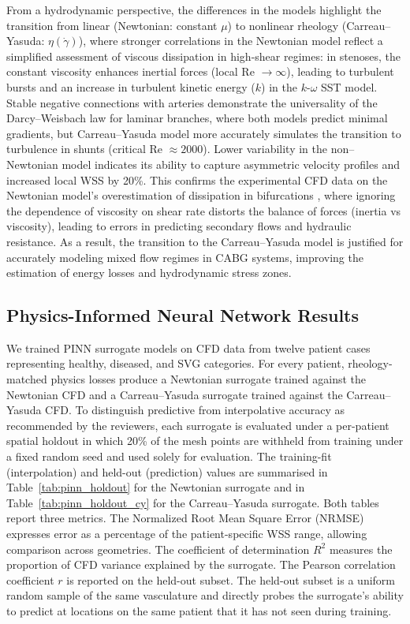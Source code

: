 ﻿\documentclass[12pt,a4paper]{article}
\newcommand{\added}[2][]{\begingroup\color{red}#2\endgroup}
\newcommand{\addp}[1]{\added{#1}}
\theoremstyle{definition}
\numberwithin{equation}{section}
\begin{document}
From a hydrodynamic perspective, the differences in the models highlight the transition from linear (Newtonian: constant $\mu$) to nonlinear rheology (Carreau--Yasuda: $\eta(\dot{\gamma})$), where stronger correlations in the Newtonian model reflect a simplified assessment of viscous dissipation in high-shear regimes: in stenoses, the constant viscosity enhances inertial forces (local Re $\rightarrow \infty$), leading to turbulent bursts and an increase in turbulent kinetic energy ($k$) in the $k$-$\omega$ SST model. Stable negative connections with arteries demonstrate the universality of the Darcy--Weisbach law for laminar branches, where both models predict minimal gradients, but Carreau--Yasuda model more accurately simulates the transition to turbulence in shunts (critical Re $\approx 2000$). Lower variability in the non--Newtonian model indicates its ability to capture asymmetric velocity profiles and increased local WSS by 20\%. This confirms the experimental CFD data on the Newtonian model's overestimation of dissipation in bifurcations \cite{10.1007/s42452-020-03561-w}, where ignoring the dependence of viscosity on shear rate distorts the balance of forces (inertia vs viscosity), leading to errors in predicting secondary flows and hydraulic resistance. As a result, the transition to the Carreau--Yasuda model is justified for accurately modeling mixed flow regimes in CABG systems, improving the estimation of energy losses and hydrodynamic stress zones.


\subsection{\label{PINN Results}{Physics-Informed Neural Network Results}}

\hspace*{\parindent}
\addp{We trained PINN surrogate models on CFD data from twelve patient cases representing healthy, diseased, and SVG categories. For every patient, rheology-matched physics losses produce a Newtonian surrogate trained against the Newtonian CFD and a Carreau--Yasuda surrogate trained against the Carreau--Yasuda CFD. To distinguish predictive from interpolative accuracy as recommended by the reviewers, each surrogate is evaluated under a per-patient spatial holdout in which 20\% of the mesh points are withheld from training under a fixed random seed and used solely for evaluation. The training-fit (interpolation) and held-out (prediction) values are summarised in Table~\ref{tab:pinn_holdout} for the Newtonian surrogate and in Table~\ref{tab:pinn_holdout_cy} for the Carreau--Yasuda surrogate. Both tables report three metrics. The Normalized Root Mean Square Error (NRMSE) expresses error as a percentage of the patient-specific WSS range, allowing comparison across geometries. The coefficient of determination $R^2$ measures the proportion of CFD variance explained by the surrogate. The Pearson correlation coefficient $r$ is reported on the held-out subset. The held-out subset is a uniform random sample of the same vasculature and directly probes the surrogate's ability to predict at locations on the same patient that it has not seen during training.}
\end{document}
